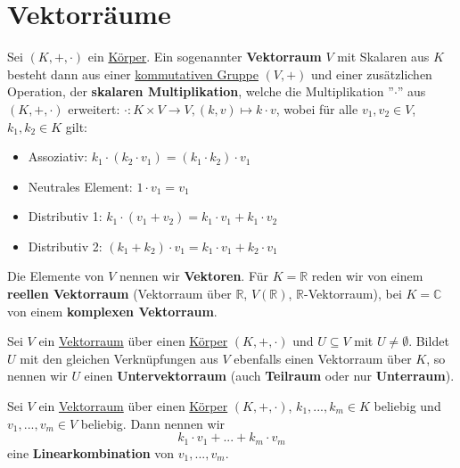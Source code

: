 \documentclass[../../main.tex]{subfiles}
\begin{document}
	
	\chapter{Vektorräume}
	
	\begin{definition}
		\label{def:Vektorraum}
		\label{def:skalareMultiplikation}
		\label{def:Vektor}
		Sei $(K, +, \cdot)$ ein \hyperref[def:Körper]{Körper}. Ein sogenannter \textbf{Vektorraum} $V$ mit Skalaren aus $K$ besteht dann aus einer \hyperref[def:kommutativeGruppe]{kommutativen Gruppe} $(V, +)$ und einer zusätzlichen Operation, der \textbf{skalaren Multiplikation}, welche die Multiplikation ''$\cdot$'' aus $(K,+,\cdot)$ erweitert: $\cdot: K \times V \rightarrow V, (k, v) \mapsto k \cdot v$, wobei für alle $v_1,v_2 \in V$, $k_1,k_2 \in K$ gilt:
		\begin{itemize}
			\item Assoziativ: $k_1 \cdot (k_2 \cdot v_1) = (k_1 \cdot k_2) \cdot v_1$
			\item Neutrales Element: $1 \cdot v_1 = v_1$
			\item Distributiv 1: $k_1 \cdot (v_1 + v_2) = k_1 \cdot v_1 + k_1 \cdot v_2$
			\item Distributiv 2: $(k_1 + k_2) \cdot v_1 = k_1 \cdot v_1 + k_2 \cdot v_1$
		\end{itemize}
		Die Elemente von $V$ nennen wir \textbf{Vektoren}. Für $K=\mathbb{R}$ reden wir von einem \textbf{reellen Vektorraum} (Vektorraum über $\mathbb{R}$, $V(\mathbb{R})$, $\mathbb{R}$-Vektorraum), bei $K=\mathbb{C}$ von einem \textbf{komplexen Vektorraum}. 
	\end{definition}

	\begin{definition}
		\label{def:Teilraum}
		\label{def:Untervektorraum}
		\label{def:Unterraum}
		Sei $V$ ein \hyperref[def:Vektorraum]{Vektorraum} über einen \hyperref[def:Körper]{Körper} $(K,+,\cdot)$ und $U \subseteq V$ mit $U\not=\emptyset$. Bildet $U$ mit den gleichen Verknüpfungen aus $V$ ebenfalls einen Vektorraum über $K$, so nennen wir $U$ einen \textbf{Untervektorraum} (auch \textbf{Teilraum} oder nur \textbf{Unterraum}). 
	\end{definition}

	\begin{definition}[Linearkombination]
		\label{def:Linearkombination}
		Sei $V$ ein \hyperref[def:Vektorraum]{Vektorraum} über einen \hyperref[def:Körper]{Körper} $(K,+,\cdot)$, $k_1,...,k_m \in K$ beliebig und $v_1,...,v_m\in V$ beliebig. Dann nennen wir $$k_1 \cdot v_1 + ... + k_m \cdot v_m$$ eine \textbf{Linearkombination} von $v_1,...,v_m$. 
	\end{definition}
\end{document}
